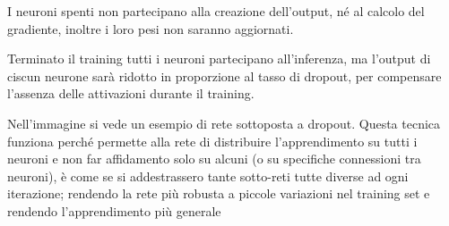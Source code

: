 I neuroni spenti non partecipano alla creazione dell'output, né al calcolo del gradiente, inoltre i loro pesi non saranno aggiornati.

Terminato il training tutti i neuroni partecipano all'inferenza, ma l'output di ciscun neurone sarà ridotto in proporzione al tasso di dropout, per compensare l'assenza delle attivazioni durante il training.

Nell'immagine si vede un esempio di rete sottoposta a dropout. Questa tecnica funziona perché permette alla rete di distribuire l'apprendimento su tutti i neuroni e non far affidamento solo su alcuni (o su specifiche connessioni tra neuroni), è come se si addestrassero tante sotto-reti tutte diverse ad ogni iterazione; rendendo la rete più robusta a piccole variazioni nel training set e rendendo l'apprendimento più generale